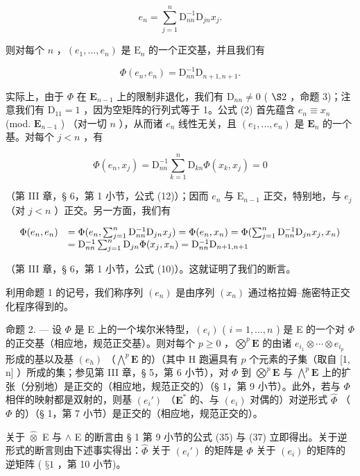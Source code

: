 \[
e _ {n} = \sum_ {j = 1} ^ {n} \mathrm{D} _ {n n} ^ {- 1} \mathrm{D} _ {j n} x _ {j}.\tag{2}
\]

则对每个 \(n\) ，\((e_{1},\ldots,e_{n})\) 是 \(\mathrm{E}_{n}\) 的一个正交基，并且我们有

\[
\Phi (e _ {n}, e _ {n}) = \mathrm{D} _ {n n} ^ {- 1} \mathrm{D} _ {n + 1, n + 1}.\tag{3}
\]

实际上，由于 \(\Phi\) 在 \(\mathbf{E}_{n-1}\) 上的限制非退化，我们有 \(\mathrm{D}_{nn} \neq 0\) ( \(\S 2\) ，命题 3)；注意我们有 \(\mathrm{D}_{11} = 1\) ，因为空矩阵的行列式等于 1。公式 (2) 首先蕴含 \(e_n \equiv x_n\) (mod. \(\mathbf{E}_{n-1}\) ) （对一切 \(n\) ），从而诸 \(e_n\) 线性无关，且 \((e_1, \ldots, e_n)\) 是 \(\mathbf{E}_n\) 的一个基。对每个 \(j < n\) ，有

\[
\Phi (e _ {n}, x _ {j}) = \mathrm{D} _ {n n} ^ {- 1} \sum_ {k = 1} ^ {n} \mathrm{D} _ {k n} \Phi (x _ {k}, x _ {j}) = 0
\]

（第 III 章，§ 6，第 1 小节，公式 (12)）；因而 \(e_n\) 与 \(\mathrm{E}_{n-1}\) 正交，特别地，与 \(e_j\) （对 \(j < n\) ）正交。另一方面，我们有

\[
\begin{array}{r l} \Phi (e _ {n}, e _ {n}) & = \Phi (e _ {n}, \sum_ {j = 1} ^ {n} \mathrm{D} _ {n n} ^ {- 1} \mathrm{D} _ {j n} x _ {j}) = \Phi (e _ {n}, x _ {n}) = \Phi (\sum_ {j = 1} ^ {n} \mathrm{D} _ {n n} ^ {- 1} \mathrm{D} _ {j n} x _ {j}, x _ {n}) \\ & = \mathrm{D} _ {n n} ^ {- 1} \sum_ {j = 1} ^ {n} \mathrm{D} _ {j n} \Phi (x _ {j}, x _ {n}) = \mathrm{D} _ {n n} ^ {- 1} \mathrm{D} _ {n + 1, n + 1} \end{array}
\]

（第 III 章，§ 6，第 1 小节，公式 (10)）。这就证明了我们的断言。

利用命题 1 的记号，我们称序列 \((e_n)\) 是由序列 \((x_n)\) 通过格拉姆–施密特正交化程序得到的。

命题 2. --- 设 \(\Phi\) 是 E 上的一个埃尔米特型，\((e_i)\) ( \(i = 1, \ldots, n\) ) 是 E 的一个对 \(\Phi\) 的正交基（相应地，规范正交基）。则对每个 \(p \geqslant 0\) ，\(\bigotimes^{p} \mathbf{E}\) 的由诸 \(e_{i_1} \otimes \cdots \otimes e_{i_p}\) 形成的基以及基 \((e_h)\) （\(\bigwedge^{p} \mathbf{E}\) 的）（其中 H 跑遍具有 \(p\) 个元素的子集（取自 {[}1, n{]} ）所成的集；参见第 III 章，§ 5，第 6 小节），对 \(\Phi\) 到 \(\bigotimes^{p} \mathbf{E}\) 与 \(\bigwedge^{p} \mathbf{E}\) 上的扩张（分别地）是正交的（相应地，规范正交的）（§ 1，第 9 小节）。此外，若与 \(\Phi\) 相伴的映射都是双射的，则基 \((e_i')\) （\(\mathbf{E}^*\) 的、与 \((e_i)\) 对偶的）对逆形式 \(\hat{\Phi}\) （\(\Phi\) 的）（§ 1，第 7 小节）是正交的（相应地，规范正交的）。

关于 \(\widehat{\otimes}\) E 与 \(\wedge\) E 的断言由 § 1 第 9 小节的公式 (35) 与 (37) 立即得出。关于逆形式的断言则由下述事实得出：\(\widehat{\Phi}\) 关于 \((e_i')\) 的矩阵是 \(\Phi\) 关于 \((e_i)\) 的矩阵的逆矩阵 ( \(§ 1\) ，第 10 小节)。

